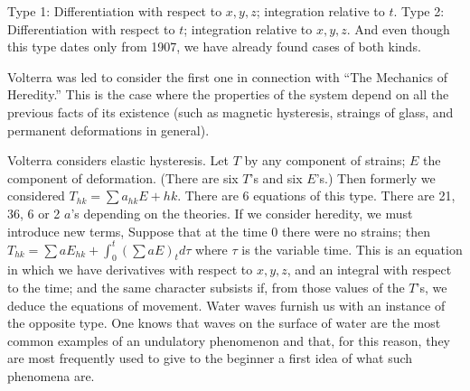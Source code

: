 \documentclass[12pt,oneside]{book}
\begin{document}
Type 1: Differentiation with respect to $x,y,z$; integration relative to $t$. Type 2: Differentiation with respect to $t$; integration relative to $x,y,z$. And even though this type dates only from 1907, we have already found cases of both kinds. \par

Volterra was led to consider the first one in connection with ``The Mechanics of Heredity.'' This is the case where the properties of the system depend on all the previous facts of its existence (such as magnetic hysteresis, straings of glass, and permanent deformations in general). \par

Volterra considers elastic hysteresis. Let $T$ by any component of strains; $E$ the component of deformation. (There are six $T$'s and six $E$'s.) Then formerly we considered $T_{hk}=\sum a_{hk}E+{hk}$. There are 6 equations of this type. There are 21, 36, 6 or 2 $a$'s depending on the theories. If we consider heredity, we must introduce new terms, Suppose that at the time 0 there were no strains; then $T_{hk}=\sum aE_{hk}+\int_0^t(\sum aE)_td\tau$ where $\tau$ is the variable time. This is an equation in which we have derivatives with respect to $x,y,z$, and an integral with respect to the time; and the same character subsists if, from those values of the $T$'s, we deduce the equations of movement. Water waves furnish us with an instance of the opposite type. One knows that waves on the surface of water are the most common examples of an undulatory phenomenon and that, for this reason, they are most frequently used to give to the beginner a first idea of what such phenomena are. \par
\end{document}
